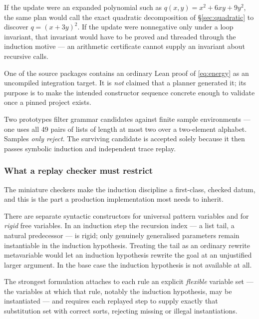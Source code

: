 If the update were an expanded polynomial such as $q(x,y)=x^2+6xy+9y^2$, the
same plan would call the exact quadratic decomposition of
\S\ref{sec:quadratic} to discover $q=(x+3y)^2$. If the update were nonnegative
only under a loop invariant, that invariant would have to be proved and threaded
through the induction motive --- an arithmetic certificate cannot supply an
invariant about recursive calls.

One of the source packages contains an ordinary Lean proof of \eqref{eq:energy}
as an uncompiled integration target. It is \emph{not} claimed that a planner
generated it; its purpose is to make the intended constructor sequence concrete
enough to validate once a pinned project exists.

\begin{remark}
Two prototypes filter grammar candidates against finite sample environments ---
one uses all 49 pairs of lists of length at most two over a two-element
alphabet. Samples \emph{only reject}. The surviving candidate is accepted solely
because it then passes symbolic induction and independent trace replay.
\end{remark}

\subsubsection*{What a replay checker must restrict}

The miniature checkers make the induction discipline a first-class, checked
datum, and this is the part a production implementation most needs to inherit.

There are separate syntactic constructors for universal pattern variables and
for \emph{rigid} free variables. In an induction step the recursion index --- a
list tail, a natural predecessor --- is rigid; only genuinely generalised
parameters remain instantiable in the induction hypothesis. Treating the tail as
an ordinary rewrite metavariable would let an induction hypothesis rewrite the
goal at an unjustified larger argument. In the base case the induction
hypothesis is not available at all.

The strongest formulation attaches to each rule an explicit \emph{flexible}
variable set --- the variables at which that rule, notably the induction
hypothesis, may be instantiated --- and requires each replayed step to supply
exactly that substitution set with correct sorts, rejecting missing or illegal
instantiations.

